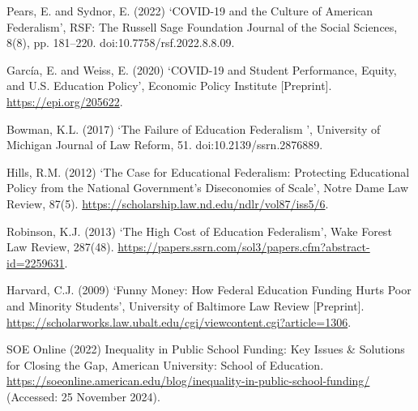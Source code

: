 \documentclass[11pt]{extarticle}
\begin{document}
\par \vspace{0.5cm}
\begin{hangparas}{.25in}{1}
Pears, E. and Sydnor, E. (2022) ‘COVID-19 and the Culture of American Federalism’, RSF: The Russell Sage Foundation Journal of the Social Sciences, 8(8), pp. 181–220. doi:10.7758/rsf.2022.8.8.09. 
\end{hangparas}
\par \vspace{0.5cm}
\begin{hangparas}{.25in}{1}
García, E. and Weiss, E. (2020) ‘COVID-19 and Student Performance, Equity, and U.S. Education Policy’, Economic Policy Institute [Preprint]. \url{https://epi.org/205622}. 
\end{hangparas}
\par \vspace{0.5cm}
\begin{hangparas}{.25in}{1}
Bowman, K.L. (2017) ‘The Failure of Education Federalism ’, University of Michigan Journal of Law Reform, 51. doi:10.2139/ssrn.2876889. 
\end{hangparas}
\par \vspace{0.5cm}
\begin{hangparas}{.25in}{1}
Hills, R.M. (2012) ‘The Case for Educational Federalism: Protecting Educational Policy from the National Government’s Diseconomies of Scale’, Notre Dame Law Review, 87(5). \url{https://scholarship.law.nd.edu/ndlr/vol87/iss5/6}. 
\end{hangparas}
\par \vspace{0.5cm}
\begin{hangparas}{.25in}{1}
Robinson, K.J. (2013) ‘The High Cost of Education Federalism’, Wake Forest Law Review, 287(48). \url{https://papers.ssrn.com/sol3/papers.cfm?abstract-id=2259631}. 
\end{hangparas}
\par \vspace{0.5cm}
\begin{hangparas}{.25in}{1}
Harvard, C.J. (2009) ‘Funny Money: How Federal Education Funding Hurts Poor and Minority Students’, University of Baltimore Law Review [Preprint]. \url{https://scholarworks.law.ubalt.edu/cgi/viewcontent.cgi?article=1306}. 
\end{hangparas}
\par \vspace{0.5cm}
\begin{hangparas}{.25in}{1}
SOE Online (2022) Inequality in Public School Funding: Key Issues \& Solutions for Closing the Gap, American University: School of Education. \url{https://soeonline.american.edu/blog/inequality-in-public-school-funding/} (Accessed: 25 November 2024). 
\end{hangparas}
\end{document}
